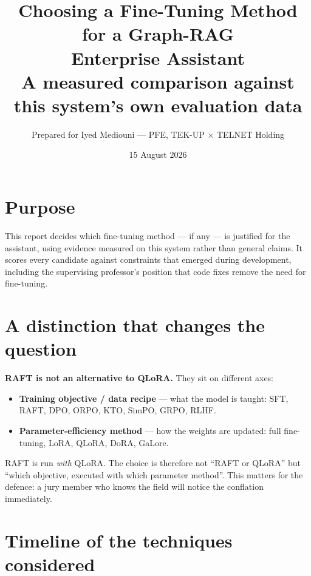 \documentclass[11pt,a4paper]{article}
\title{\vspace{-1.5cm}\textbf{Choosing a Fine-Tuning Method for a Graph-RAG\\Enterprise Assistant}\\[0.3cm]
\large A measured comparison against this system's own evaluation data}
\author{Prepared for Iyed Mediouni --- PFE, TEK-UP $\times$ TELNET Holding}
\date{15 August 2026}
\begin{document}
\maketitle
\vspace{-0.8cm}

\section*{Purpose}
This report decides which fine-tuning method --- if any --- is justified for the assistant, using
evidence measured on this system rather than general claims. It scores every candidate against
constraints that emerged during development, including the supervising professor's position that
code fixes remove the need for fine-tuning.

\section{A distinction that changes the question}

\textbf{RAFT is not an alternative to QLoRA.} They sit on different axes:

\begin{itemize}[leftmargin=1.2em,itemsep=2pt]
  \item \textbf{Training objective / data recipe} --- what the model is taught:
        SFT, RAFT, DPO, ORPO, KTO, SimPO, GRPO, RLHF.
  \item \textbf{Parameter-efficiency method} --- how the weights are updated:
        full fine-tuning, LoRA, QLoRA, DoRA, GaLore.
\end{itemize}

RAFT is run \emph{with} QLoRA. The choice is therefore not ``RAFT or QLoRA'' but
``which objective, executed with which parameter method''. This matters for the defence: a jury
member who knows the field will notice the conflation immediately.

\section{Timeline of the techniques considered}
\end{document}
